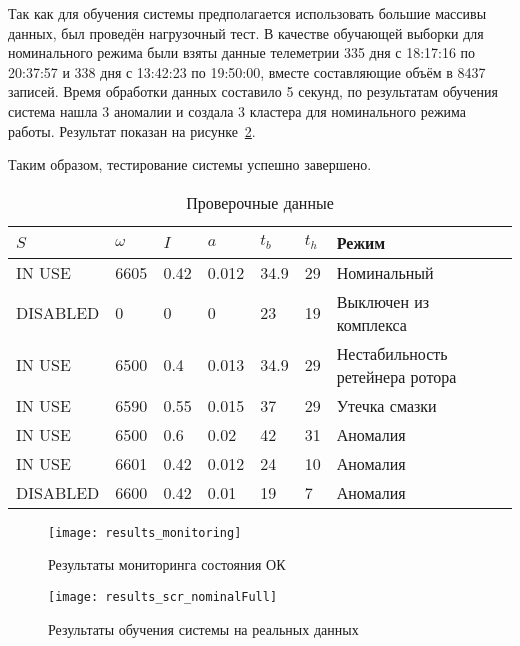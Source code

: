 Так как для обучения системы предполагается использовать большие массивы данных, был проведён нагрузочный тест. В качестве обучающей выборки для номинального режима были взяты данные телеметрии 335 дня с 18:17:16 по 20:37:57 и 338 дня с 13:42:23 по 19:50:00, вместе составляющие объём в 8437 записей. Время обработки данных составило 5 секунд, по результатам обучения система нашла 3 аномалии и создала 3 кластера для номинального режима работы. Результат показан на рисунке~\ref{fig:spec:results:scr:nominalFull}.

Таким образом, тестирование системы успешно завершено.

\begin{table}
\caption{Проверочные данные}
\label{tab:spec:results:input}
\begin{tabular}{|C{80pt}|C{50pt}|C{50pt}|C{50pt}|C{50pt}|C{50pt}|C{100pt}|}
\hline
$S$ & $\omega$ & $I$ & $a$ & $t_b$ & $t_h$ & Режим \\
\hline
IN USE & 6605 & 0.42 & 0.012 & 34.9 & 29 & Номинальный \\
\hline
DISABLED & 0 & 0 & 0 & 23 & 19 & Выключен из комплекса \\
\hline
IN USE & 6500 & 0.4 & 0.013 & 34.9 & 29 & Нестабильность ретейнера ротора \\
\hline
IN USE & 6590 & 0.55 & 0.015 & 37 & 29 & Утечка смазки \\
\hline
IN USE & 6500 & 0.6 & 0.02 & 42 & 31 & Аномалия \\
\hline
IN USE & 6601 & 0.42 & 0.012 & 24 & 10 & Аномалия \\
\hline
DISABLED & 6600 & 0.42 & 0.01 & 19 & 7 & Аномалия \\
\hline
\end{tabular}
\end{table}

\begin{figure}
\caption{Результаты мониторинга состояния ОК}
\label{fig:spec:results:monitoring}
\texttt{[image: results\_monitoring]}
\end{figure}

\begin{figure}
\caption{Результаты обучения системы на реальных данных}
\label{fig:spec:results:scr:nominalFull}
\texttt{[image: results\_scr\_nominalFull]}
\end{figure}